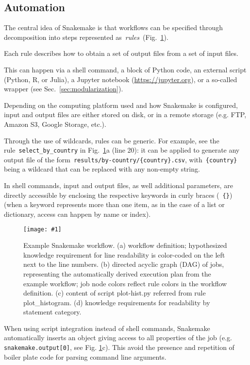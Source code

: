 \documentclass[parskip=half]{scrartcl}
\newcommand{\image}[1]{\centering\texttt{[image: \#1]}}
\let\plainurl\url
\renewcommand{\url}[1]{\protect\plainurl{#1}}
\begin{document}
\subsection{Automation}\label{sec:automation}

The central idea of Snakemake is that workflows can be specified through decomposition into steps represented as~\emph{rules~}(Fig.~\ref{fig:example}).

Each rule describes how to obtain a set of output files from a set of input files.

This can happen via a shell command, a block of Python code, an external script (Python, R, or Julia), a Jupyter notebook (\url{https://jupyter.org}), or a so-called wrapper (see Sec.~\ref{sec:modularization}).

Depending on the computing platform used and how Snakemake is configured, input and output files are either stored on disk, or in a remote storage (e.g. FTP, Amazon S3, Google Storage, etc.).

Through the use of wildcards, rules can be generic. For example, see the rule~\lstinline!select_by_country! in Fig.~\ref{fig:example}a (line 20): it can be applied to generate any output file of the form~\lstinline!results/by-country/{country}.csv!, with~\lstinline!{country}! being a wildcard that can be replaced with any non-empty string.

In shell commands, input and output files, as well additional parameters, are directly accessible by enclosing the respective keywords in curly braces (~\lstinline!{}!) (when a keyword represents more than one item, as in the case of a list or dictionary, access can happen by name or index).

\begin{figure}
	\image{example-workflow.pdf}
	\caption{
		Example Snakemake workflow. (a) workflow definition; hypothesized knowledge requirement for line readability is color-coded on the left next to the line numbers. (b) directed acyclic graph (DAG) of jobs, representing the automatically derived execution plan from the example workflow; job node colors reflect rule colors in the workflow definition. (c) content of script plot-hist.py referred from rule plot\_histogram. (d) knowledge requirements for readability by statement category.
	}
	\label{fig:example}
\end{figure}

When using script integration instead of shell commands, Snakemake automatically inserts an object giving access to all properties of the job (e.g. \lstinline!snakemake.output[0]!, see Fig.
\ref{fig:example}c).
This avoid the presence and repetition of boiler plate code for parsing command line arguments.
\end{document}
